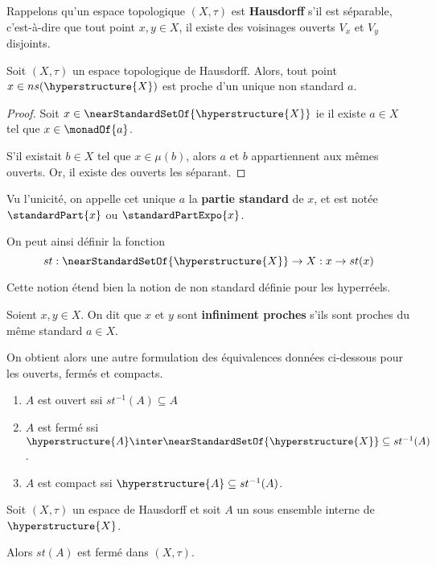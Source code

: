 Rappelons qu'un espace topologique $(X, \tau)$ est \textbf{Hausdorff} s'il est
séparable, c'est-à-dire que tout point $x, y \in X$, il existe des voisinages
ouverts $V_{x}$ et $V_{y}$ disjoints.

\begin{proposition}
	Soit $(X, \tau)$ un espace topologique de Hausdorff. Alors, tout point $x
	\in ns(\hyperstructure{X})$ est proche d'un unique non standard $a$.
\end{proposition}

\ifdefined\outputproof
\begin{proof}
	Soit $x \in \nearStandardSetOf{\hyperstructure{X}}$ ie il existe $a \in X$
	tel que $x \in \monadOf{a}$.

	S'il existait $b \in X$ tel que $x \in \mu(b)$, alors $a$ et $b$
	appartiennent aux mêmes ouverts. Or, il existe des ouverts les séparant.
\end{proof}
\fi

Vu l'unicité, on appelle cet unique $a$ la \textbf{partie
standard} de $x$, et est notée $\standardPart{x}$ ou $\standardPartExpo{x}$.

On peut ainsi définir la fonction
\begin{equation}
	st : \nearStandardSetOf{\hyperstructure{X}} \rightarrow X : x \rightarrow st(x)
\end{equation}

Cette notion étend bien la notion de non standard définie pour les hyperréels.

\begin{definition}
	Soient $x, y \in X$. On dit que $x$ et $y$ sont \textbf{infiniment proches}
	s'ils sont proches du même standard $a \in X$.
\end{definition}

On obtient alors une autre formulation des équivalences données ci-dessous pour
les ouverts, fermés et compacts.

\begin{enumerate}
	\item $A$ est ouvert ssi $st^{-1}(A) \subseteq A$
	\item $A$ est fermé ssi $\hyperstructure{A} \inter
		\nearStandardSetOf{\hyperstructure{X}} \subseteq st^{-1}(A)$.
	\item $A$ est compact ssi $\hyperstructure{A} \subseteq st^{-1}(A)$.
\end{enumerate}

\begin{proposition}
	Soit $(X, \tau)$ un espace de Hausdorff et soit $A$ un sous ensemble interne
	de $\hyperstructure{X}$.

	Alors $st(A)$ est fermé dans $(X, \tau)$.
\end{proposition}

